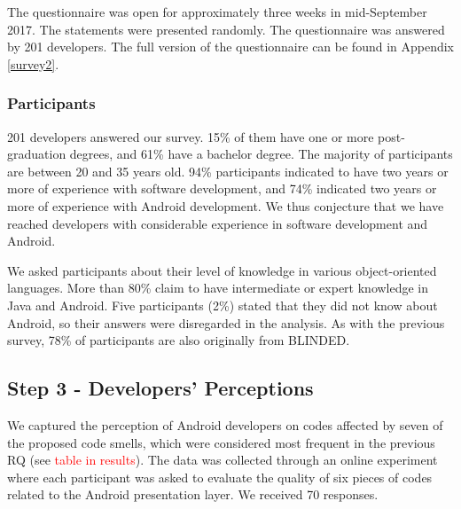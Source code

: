 
The questionnaire was open for approximately three weeks in mid-September 2017. The statements were presented randomly. The questionnaire was answered by 201 developers. The full version of the questionnaire can be found in Appendix \ref{survey2}.


\subsubsection{Participants}
\label{etapa-2-participantes}

201 developers answered our survey. 15\% of them have one or more post-graduation degrees, and 61\% have a bachelor degree. The majority of participants are between 20 and 35 years old.
94\% participants indicated to have two years or more of experience with software development, and 74\% indicated two years or more of experience with Android development. We thus conjecture that we have reached developers with considerable experience in software development and Android.


We asked participants about their level of knowledge in various object-oriented languages. More than 80\% claim to have intermediate or expert knowledge in Java and Android. Five participants (2\%) stated that they did not know about Android, so their answers were disregarded in the analysis.
As with the previous survey, 78\% of participants are also originally from BLINDED. 


\subsection{Step 3 - Developers' Perceptions}
\label{etapa-3}


We captured the perception of Android developers on codes affected by seven of the proposed code smells, which were considered most frequent in the previous RQ (see \textcolor{red}{table in results}). The data was collected through an online experiment where each participant was asked to evaluate the quality of six pieces of codes related to the Android presentation layer. We received 70 responses. 

